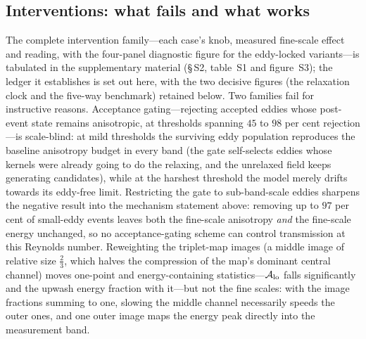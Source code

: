 \documentclass[lineno]{JFM-FLM_Au}
\begin{document}
\subsection{Interventions: what fails and what works}\label{sec:interventions}

The complete intervention family---each case's knob, measured
fine-scale effect and reading, with the four-panel diagnostic figure
for the eddy-locked variants---is tabulated in the supplementary
material (\S\,S2, table~S1 and figure~S3); the ledger it establishes
is set out here, with the two decisive figures (the relaxation clock
and the five-way benchmark) retained below. Two
families fail for instructive reasons. Acceptance gating---rejecting
accepted eddies whose post-event state remains anisotropic, at thresholds
spanning $45$ to $98$ per cent rejection---is scale-blind: at mild
thresholds the surviving eddy population reproduces the baseline
anisotropy budget in every band (the gate self-selects eddies whose
kernels were already going to do the relaxing, and the unrelaxed field
keeps generating candidates), while at the harshest threshold the model
merely drifts towards its eddy-free limit. Restricting the gate to
sub-band-scale eddies sharpens the negative result into the mechanism
statement above: removing up to $97$ per cent of small-eddy events leaves
both the fine-scale anisotropy \emph{and} the fine-scale energy
unchanged, so no acceptance-gating scheme can control transmission at
this Reynolds number. Reweighting the triplet-map images (a middle image
of relative size $\tfrac23$, which halves the compression of the
map's dominant central channel) moves one-point and energy-containing
statistics---$\mathcal A_{\rm lo}$ falls significantly and the upwash
energy fraction with it---but not the fine scales: with the image
fractions summing to one, slowing the middle channel necessarily speeds
the outer ones, and one outer image maps the energy peak directly into
the measurement band.
\end{document}
